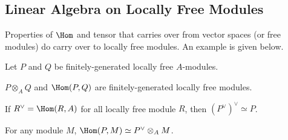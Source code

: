 \subsection{Linear Algebra on Locally Free Modules}
Properties of $\Hom$ and tensor that carries
over from vector spaces (or free modules)
do carry over to locally free modules.
An example is given below.
\begin{theorem}
    Let $P$ and $Q$ be finitely-generated 
    locally free $A$-modules.
    \begin{alphenum}
    \item $P\otimes_A Q$ and $\Hom(P,Q)$ are finitely-generated
    locally free modules.
    \item If $R^\vee = \Hom(R,A)$ for all locally free module $R$, 
    then $(P^\vee)^\vee \simeq P$.
    \item For any module $M$, $\Hom(P,M)\simeq P^\vee\otimes_A M$.
    \end{alphenum}
\end{theorem}
